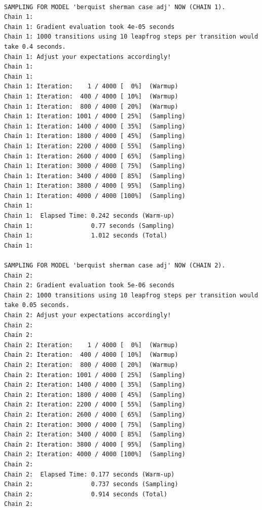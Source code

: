 \documentclass[
  letterpaper,
  DIV=11,
  numbers=noendperiod]{scrartcl}
\begin{document}
\begin{verbatim}

SAMPLING FOR MODEL 'berquist sherman case adj' NOW (CHAIN 1).
Chain 1: 
Chain 1: Gradient evaluation took 4e-05 seconds
Chain 1: 1000 transitions using 10 leapfrog steps per transition would take 0.4 seconds.
Chain 1: Adjust your expectations accordingly!
Chain 1: 
Chain 1: 
Chain 1: Iteration:    1 / 4000 [  0%]  (Warmup)
Chain 1: Iteration:  400 / 4000 [ 10%]  (Warmup)
Chain 1: Iteration:  800 / 4000 [ 20%]  (Warmup)
Chain 1: Iteration: 1001 / 4000 [ 25%]  (Sampling)
Chain 1: Iteration: 1400 / 4000 [ 35%]  (Sampling)
Chain 1: Iteration: 1800 / 4000 [ 45%]  (Sampling)
Chain 1: Iteration: 2200 / 4000 [ 55%]  (Sampling)
Chain 1: Iteration: 2600 / 4000 [ 65%]  (Sampling)
Chain 1: Iteration: 3000 / 4000 [ 75%]  (Sampling)
Chain 1: Iteration: 3400 / 4000 [ 85%]  (Sampling)
Chain 1: Iteration: 3800 / 4000 [ 95%]  (Sampling)
Chain 1: Iteration: 4000 / 4000 [100%]  (Sampling)
Chain 1: 
Chain 1:  Elapsed Time: 0.242 seconds (Warm-up)
Chain 1:                0.77 seconds (Sampling)
Chain 1:                1.012 seconds (Total)
Chain 1: 

SAMPLING FOR MODEL 'berquist sherman case adj' NOW (CHAIN 2).
Chain 2: 
Chain 2: Gradient evaluation took 5e-06 seconds
Chain 2: 1000 transitions using 10 leapfrog steps per transition would take 0.05 seconds.
Chain 2: Adjust your expectations accordingly!
Chain 2: 
Chain 2: 
Chain 2: Iteration:    1 / 4000 [  0%]  (Warmup)
Chain 2: Iteration:  400 / 4000 [ 10%]  (Warmup)
Chain 2: Iteration:  800 / 4000 [ 20%]  (Warmup)
Chain 2: Iteration: 1001 / 4000 [ 25%]  (Sampling)
Chain 2: Iteration: 1400 / 4000 [ 35%]  (Sampling)
Chain 2: Iteration: 1800 / 4000 [ 45%]  (Sampling)
Chain 2: Iteration: 2200 / 4000 [ 55%]  (Sampling)
Chain 2: Iteration: 2600 / 4000 [ 65%]  (Sampling)
Chain 2: Iteration: 3000 / 4000 [ 75%]  (Sampling)
Chain 2: Iteration: 3400 / 4000 [ 85%]  (Sampling)
Chain 2: Iteration: 3800 / 4000 [ 95%]  (Sampling)
Chain 2: Iteration: 4000 / 4000 [100%]  (Sampling)
Chain 2: 
Chain 2:  Elapsed Time: 0.177 seconds (Warm-up)
Chain 2:                0.737 seconds (Sampling)
Chain 2:                0.914 seconds (Total)
Chain 2: 


\end{verbatim}
\end{document}
